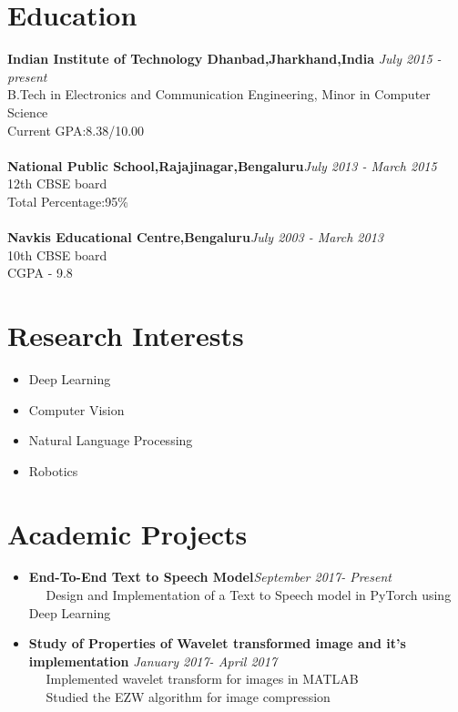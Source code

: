 \documentclass[margin, centered]{res}
\begin{document}
\begin{resume}

\section{\textbf{Education}}

\textbf{Indian Institute of Technology Dhanbad,Jharkhand,India} \hfill\textit{ July 2015 - present}\\
B.Tech in Electronics and Communication Engineering, Minor in Computer Science\\
Current GPA:8.38/10.00\\ \\
\textbf{National Public School,Rajajinagar,Bengaluru}\hfill\textit{July 2013 - March 2015}\\
12th CBSE board\\
Total Percentage:95\%\\ \\
\textbf{Navkis Educational Centre,Bengaluru}\hfill\textit{July 2003 - March 2013}\\
10th CBSE board\\
CGPA - 9.8\\

\section{\textbf{Research Interests}}
\begin{itemize}
\item Deep Learning
\item Computer Vision
\item Natural Language Processing
\item Robotics
\end{itemize}

\section{\textbf{Academic Projects}}
\begin{itemize}
\item \textbf{End-To-End Text to Speech Model}\hfill\textit{September 2017- Present}\\
~\textbullet~ Design and Implementation of a Text to Speech model in PyTorch using Deep Learning

\item \textbf{Study of Properties of Wavelet transformed image and it's implementation} \hfill\textit{January 2017- April 2017}\\
~\textbullet~ Implemented wavelet transform for images in MATLAB\\
~\textbullet~ Studied the EZW algorithm for image compression 


\end{itemize}
\end{resume}
\end{document}
